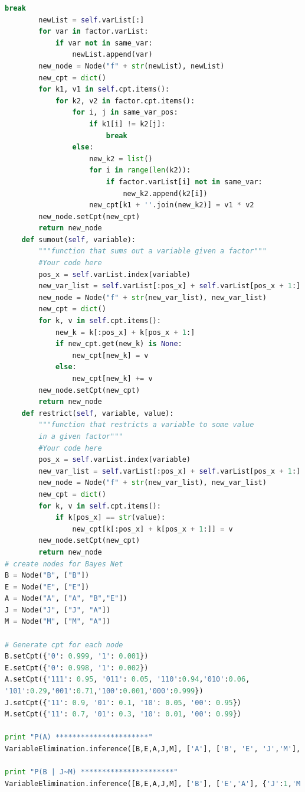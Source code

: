 \documentclass[a4paper, 11pt]{article}
\begin{document}
\begin{lstlisting}[language=Python,frame=single]
                    break
        newList = self.varList[:]
        for var in factor.varList:
            if var not in same_var:
                newList.append(var)
        new_node = Node("f" + str(newList), newList)
        new_cpt = dict()
        for k1, v1 in self.cpt.items():
            for k2, v2 in factor.cpt.items():
                for i, j in same_var_pos:
                    if k1[i] != k2[j]:
                        break
                else:
                    new_k2 = list()
                    for i in range(len(k2)):
                        if factor.varList[i] not in same_var:
                            new_k2.append(k2[i])
                    new_cpt[k1 + ''.join(new_k2)] = v1 * v2
        new_node.setCpt(new_cpt)
        return new_node
    def sumout(self, variable):
        """function that sums out a variable given a factor"""
        #Your code here
        pos_x = self.varList.index(variable)
        new_var_list = self.varList[:pos_x] + self.varList[pos_x + 1:]
        new_node = Node("f" + str(new_var_list), new_var_list)
        new_cpt = dict()
        for k, v in self.cpt.items():
            new_k = k[:pos_x] + k[pos_x + 1:]
            if new_cpt.get(new_k) is None:
                new_cpt[new_k] = v
            else:
                new_cpt[new_k] += v
        new_node.setCpt(new_cpt)
        return new_node
    def restrict(self, variable, value):
        """function that restricts a variable to some value 
        in a given factor"""
        #Your code here
        pos_x = self.varList.index(variable)
        new_var_list = self.varList[:pos_x] + self.varList[pos_x + 1:]
        new_node = Node("f" + str(new_var_list), new_var_list)
        new_cpt = dict()
        for k, v in self.cpt.items():
            if k[pos_x] == str(value):
                new_cpt[k[:pos_x] + k[pos_x + 1:]] = v
        new_node.setCpt(new_cpt)
        return new_node
# create nodes for Bayes Net
B = Node("B", ["B"])
E = Node("E", ["E"])
A = Node("A", ["A", "B","E"])
J = Node("J", ["J", "A"])
M = Node("M", ["M", "A"])

# Generate cpt for each node
B.setCpt({'0': 0.999, '1': 0.001})
E.setCpt({'0': 0.998, '1': 0.002})
A.setCpt({'111': 0.95, '011': 0.05, '110':0.94,'010':0.06,
'101':0.29,'001':0.71,'100':0.001,'000':0.999})
J.setCpt({'11': 0.9, '01': 0.1, '10': 0.05, '00': 0.95})
M.setCpt({'11': 0.7, '01': 0.3, '10': 0.01, '00': 0.99})

print "P(A) **********************"
VariableElimination.inference([B,E,A,J,M], ['A'], ['B', 'E', 'J','M'], {})

print "P(B | J~M) **********************"
VariableElimination.inference([B,E,A,J,M], ['B'], ['E','A'], {'J':1,'M':0})
\end{lstlisting}
\end{document}
